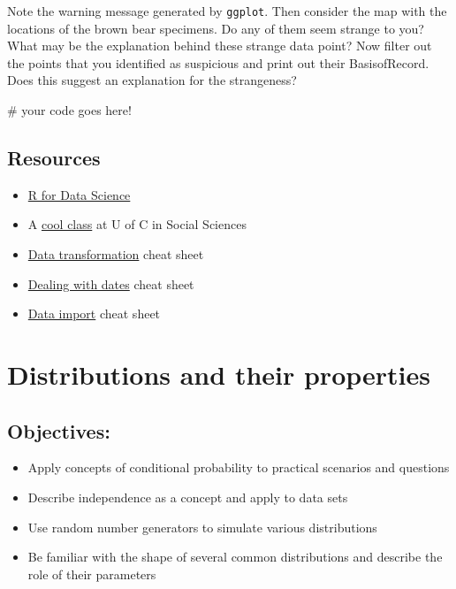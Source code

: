 \documentclass[
  letterpaper,
  DIV=11,
  numbers=noendperiod]{scrreprt}
\newenvironment{Shaded}{\begin{snugshade}}{\end{snugshade}}
\newcommand{\NormalTok}[1]{\textcolor[rgb]{0.00,0.23,0.31}{#1}}
\providecommand{\tightlist}{%
  \setlength{\itemsep}{0pt}\setlength{\parskip}{0pt}}\usepackage{longtable,booktabs,array}
\begin{document}
Note the warning message generated by \texttt{ggplot}. Then consider the
map with the locations of the brown bear specimens. Do any of them seem
strange to you? What may be the explanation behind these strange data
point? Now filter out the points that you identified as suspicious and
print out their BasisofRecord. Does this suggest an explanation for the
strangeness?

\begin{Shaded}
\begin{Highlighting}[]
\NormalTok{\# your code goes here!}
\end{Highlighting}
\end{Shaded}

\section{Resources}\label{resources-2}

\begin{itemize}
\tightlist
\item
  \href{https://hackr.io/tutorial/r-for-data-science}{R for Data
  Science}
\item
  A \href{https://cfss.uchicago.edu/syllabus.html}{cool class} at U of C
  in Social Sciences
\item
  \href{https://github.com/rstudio/cheatsheets/raw/master/data-transformation.pdf}{Data
  transformation} cheat sheet
\item
  \href{https://github.com/rstudio/cheatsheets/raw/master/lubridate.pdf}{Dealing
  with dates} cheat sheet
\item
  \href{https://github.com/rstudio/cheatsheets/raw/master/data-import.pdf}{Data
  import} cheat sheet
\end{itemize}


\chapter{Distributions and their
properties}\label{distributions-and-their-properties}

\section{Objectives:}\label{objectives}

\begin{itemize}
\tightlist
\item
  Apply concepts of conditional probability to practical scenarios and
  questions
\item
  Describe independence as a concept and apply to data sets
\item
  Use random number generators to simulate various distributions
\item
  Be familiar with the shape of several common distributions and
  describe the role of their parameters
\end{itemize}
\end{document}

